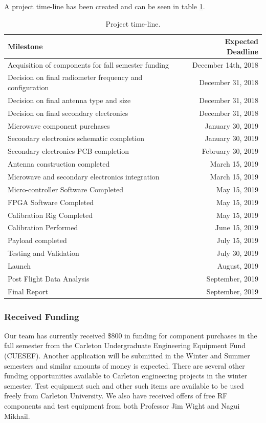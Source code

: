 \documentclass[12pt]{article}
\begin{document}
A project time-line has been created and can be seen in table \ref{tab:timeline}.

\begin{table}[H]
	\centering
	\vspace{0.5cm}
	\renewcommand{\arraystretch}{1.3}
	\caption{Project time-line.}
	\label{tab:timeline}
	\begin{tabularx}{\textwidth}{lr}
		\toprule
		Milestone & Expected Deadline\\	
		\midrule
		Acquisition of components for fall semester funding & December 14th, 2018\\
		Decision on final radiometer frequency and configuration & December 31, 2018\\
		Decision on final antenna type and size & December 31, 2018\\
		Decision on final secondary electronics & December 31, 2018\\
		Microwave component purchases  & January 30, 2019\\
		Secondary electronics schematic completion & January 30, 2019\\
		Secondary electronics PCB completion & February 30, 2019\\
		Antenna construction completed  & March 15, 2019\\
		Microwave and secondary electronics integration & March 15, 2019 \\
		Micro-controller Software Completed & May 15, 2019\\
		FPGA Software Completed & May 15, 2019\\
		Calibration Rig Completed & May 15, 2019\\
		Calibration Performed & June 15, 2019\\
		Payload completed & July 15, 2019\\
		Testing and Validation & July 30, 2019\\
		Launch & August, 2019\\
		Post Flight Data Analysis & September, 2019\\
		Final Report & September, 2019
		\end{tabularx}	
\end{table}


\subsubsection{Received Funding}

Our team has currently received \$800 in funding for component purchases in the fall semester from the Carleton Undergraduate Engineering Equipment Fund (CUESEF). Another application will be submitted in the Winter and Summer semesters and similar amounts of money is expected. There are several other funding opportunities available to Carleton engineering projects in the winter semester. Test equipment such and other such items are available to be used freely from Carleton University. We also have received offers of free RF components and test equipment from both Professor Jim Wight and Nagui Mikhail.
\end{document}
